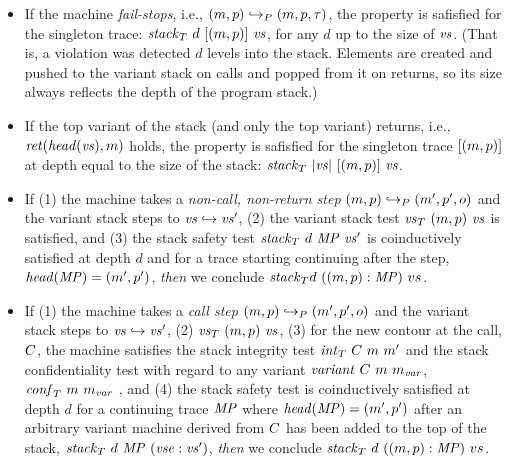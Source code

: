 \documentclass[acmsmall,review,anonymous]{acmart}\settopmatter{printfolios=true,printccs=false,printacmref=false}
\begin{document}
  \begin{itemize}

  \item If the machine \emph{fail-stops}, i.e., $(m, p) \hookrightarrow_P
    (m, p, \tau)$, the property is safisfied for the singleton trace:
    $\mathit{stack}_T ~ d ~ [(m, p)] ~ \mathit{vs}$, for any $d$ up to the size of
    $\mathit{vs}$. (That is, a violation was detected $d$ levels into the stack.
    Elements are created and pushed to the variant stack on calls and popped
    from it on returns, so its size always reflects the depth of the program
    stack.)

  \item If the top variant of the stack (and only the top variant) returns,
    i.e., $\mathit{ret}(\mathit{head}(\mathit{vs}), m)$ holds, the property is safisfied for
    the singleton trace $[(m, p)]$ at depth equal to the size of the
    stack: $\mathit{stack}_T ~ |\mathit{vs}| ~ [(m, p)] ~ \mathit{vs}$. 

  \item If
    (1) the machine takes a \emph{non-call, non-return step} $(m,
    p) \hookrightarrow_P (m', p', o)$ and the variant stack steps
    to $\mathit{vs} \hookrightarrow \mathit{vs}'$,
    (2) the variant stack test $\mathit{\mathit{vs}}_T ~
    (m, p) ~ \mathit{vs}$ is satisfied, and
    (3) the stack safety test
    $\mathit{stack}_T ~ d ~ \mathit{MP} ~ \mathit{vs}'$ is coinductively satisfied at depth $d$
    and for a trace starting continuing after the step, $\mathit{head}(\mathit{MP}) = (m',
    p')$,
    {\em then} we conclude $\mathit{stack}_T d ~ ((m, p) : \mathit{MP}) ~ vs$.

  \item
%
    If (1) the machine takes a \emph{call step} $(m, p) \hookrightarrow_P
    (m', p', o)$ and the variant stack steps to $\mathit{vs} \hookrightarrow
    \mathit{vs}'$,
%
    (2) $\mathit{\mathit{vs}}_T ~ (m, p) ~ \mathit{vs}$,
%
    (3) for the new contour at the call, $C$,  the
    machine satisfies the stack integrity test $\mathit{int}_T ~ C ~
    m ~ m'$ and the stack confidentiality test with regard to any
    variant $\mathit{variant} ~ C ~ m ~ m_{\mathit{var}}$,
    $\mathit{conf}_T ~ m ~ m_{\mathit{var}}$ ,
%
    and (4) the stack safety test is coinductively satisfied at depth $d$ for a
    continuing trace $\mathit{MP}$ where $\mathit{head}(\mathit{MP}) = (m', p')$ after an
    arbitrary variant machine derived from $C$ has been added to the top
    of the stack, $\mathit{stack}_T ~ d ~ \mathit{MP} ~ (\mathit{vse} : \mathit{vs}')$, 
%
    {\em then} we conclude $\mathit{stack}_T ~ d ~ ((m, p) : \mathit{MP}) ~ vs$.


\end{itemize}
\end{document}

